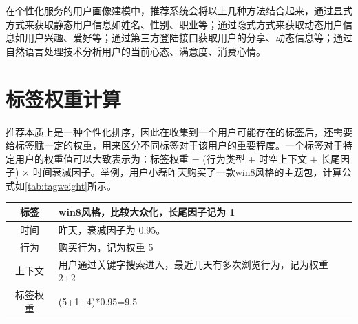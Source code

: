    在个性化服务的用户画像建模中，推荐系统会将以上几种方法结合起来，通过显式方式来获取静态用户信息如姓名、性别、职业等；通过隐式方式来获取动态用户信息如用户兴趣、爱好等；通过第三方登陆接口获取用户的分享、动态信息等；通过自然语言处理技术分析用户的当前心态、满意度、消费心情。

    \section{标签权重计算}
    推荐本质上是一种个性化排序，因此在收集到一个用户可能存在的标签后，还需要给标签赋一定的权重，用来区分不同标签对于该用户的重要程度。一个标签对于特定用户的权重值可以大致表示为：标签权重 = (行为类型 + 时空上下文 + 长尾因子) × 时间衰减因子。举例，用户小磊昨天购买了一款win8风格的主题包，计算公式如\autoref{tab:tagweight}所示。
    \begin{table}[htp]
    \centering
    \label{tab:tagweight}
    \begin{tabular}{|c|p{8cm}|} \hline
     标签 & win8风格，比较大众化，长尾因子记为 1 \\ \hline
     时间 & 昨天，衰减因子为 0.95。 \\ \hline
     行为 & 购买行为，记为权重 5 \\ \hline
     上下文 & 用户通过关键字搜索进入，最近几天有多次浏览行为，记为权重 2+2 \\ \hline
     标签权重 &  (5+1+4)*0.95=9.5 \\ \hline
    \end{tabular}
    \end{table}

